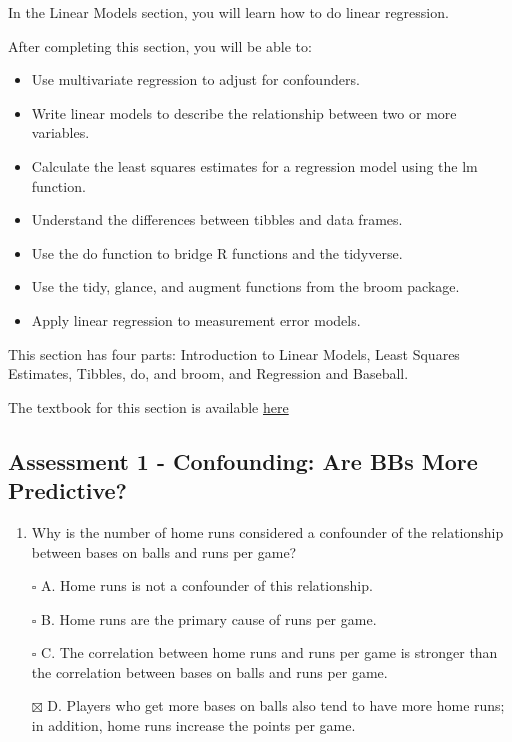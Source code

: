 \documentclass[
]{article}
\providecommand{\tightlist}{%
  \setlength{\itemsep}{0pt}\setlength{\parskip}{0pt}}
\begin{document}
In the Linear Models section, you will learn how to do linear
regression.

After completing this section, you will be able to:

\begin{itemize}
\tightlist
\item
  Use multivariate regression to adjust for confounders.
\item
  Write linear models to describe the relationship between two or more
  variables.
\item
  Calculate the least squares estimates for a regression model using the
  lm function.
\item
  Understand the differences between tibbles and data frames.
\item
  Use the do function to bridge R functions and the tidyverse.
\item
  Use the tidy, glance, and augment functions from the broom package.
\item
  Apply linear regression to measurement error models.
\end{itemize}

This section has four parts: Introduction to Linear Models, Least
Squares Estimates, Tibbles, do, and broom, and Regression and Baseball.

The textbook for this section is available
\href{https://rafalab.github.io/dsbook/linear-models.html\#confounding}{here}

\hypertarget{assessment-1---confounding-are-bbs-more-predictive}{%
\subsection{Assessment 1 - Confounding: Are BBs More
Predictive?}\label{assessment-1---confounding-are-bbs-more-predictive}}

\begin{enumerate}
\def\labelenumi{\arabic{enumi}.}
\tightlist
\item
  Why is the number of home runs considered a confounder of the
  relationship between bases on balls and runs per game?
\end{enumerate}

\begin{itemize}
\tightlist
\item[$\square$]
  A. Home runs is not a confounder of this relationship.
\item[$\square$]
  B. Home runs are the primary cause of runs per game.
\item[$\square$]
  C. The correlation between home runs and runs per game is stronger
  than the correlation between bases on balls and runs per game.
\item[$\boxtimes$]
  D. Players who get more bases on balls also tend to have more home
  runs; in addition, home runs increase the points per game.
\end{itemize}
\end{document}
